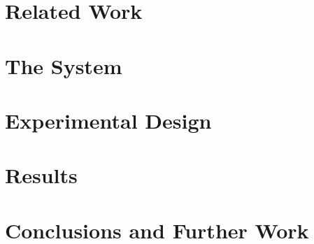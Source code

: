 \section{Related Work}

\section{The System}
\label{sec:system}

\section{Experimental Design}
\label{sec:experiment}

\section{Results}
\label{sec:result}

\section{Conclusions and Further Work}







